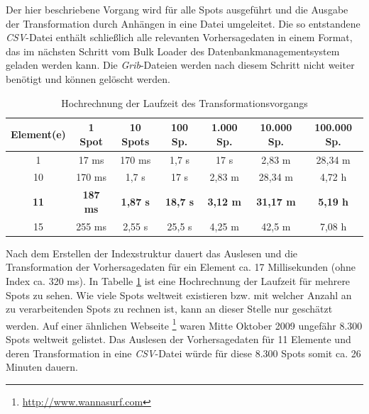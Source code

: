 

Der hier beschriebene Vorgang wird für alle Spots ausgeführt und die
Ausgabe der Transformation durch Anhängen in eine Datei
umgeleitet. Die so entstandene \textit{CSV}-Datei enthält schließlich
alle relevanten Vorhersagedaten in einem Format, das im nächsten
Schritt vom Bulk Loader des Datenbankmanagementsystem geladen werden
kann. Die \textit{Grib}-Dateien werden nach diesem Schritt nicht
weiter benötigt und können gelöscht werden.
\begin{table}[h]
  \centering
  {\sf
    \footnotesize
    \begin{longtable}{c|c|c|c|c|c|c}

      \toprule
      \textbf{Element(e)} & \textbf{1 Spot} & \textbf{10 Spots} & \textbf{100 Sp.} & \textbf{1.000 Sp.} & \textbf{10.000 Sp.} & \textbf{100.000 Sp.} \\
      \midrule
      1 & 17 ms & 170 ms & 1,7 s & 17 s & 2,83 m & 28,34 m \\
      10 & 170 ms & 1,7 s & 17 s & 2,83 m & 28,34 m & 4,72 h \\
      \textbf{11} & \textbf{187 ms} &  \textbf{1,87 s} & \textbf{18,7 s} & \textbf{3,12 m} & \textbf{31,17 m} & \textbf{5,19 h} \\
      15 & 255 ms & 2,55 s & 25,5 s & 4,25 m & 42,5 m &  7,08 h\\
      \bottomrule
    \end{longtable}
  }

  \caption{Hochrechnung der Laufzeit des Transformationsvorgangs}
  \label{tab:transformation_laufzeit}

\end{table}

Nach dem Erstellen der Indexstruktur dauert das Auslesen und die
Transformation der Vorhersagedaten für ein Element ca. 17
Millisekunden (ohne Index ca. 320 ms). In Tabelle
\ref{tab:transformation_laufzeit} ist eine Hochrechnung der Laufzeit
für mehrere Spots zu sehen. Wie viele Spots weltweit existieren
bzw. mit welcher Anzahl an zu verarbeitenden Spots zu rechnen ist,
kann an dieser Stelle nur geschätzt werden. Auf einer ähnlichen
Webseite \footnote{\url{http://www.wannasurf.com}} waren Mitte Oktober
2009 ungefähr 8.300 Spots weltweit gelistet. Das Auslesen der
Vorhersagedaten für 11 Elemente und deren Transformation in eine
\textit{CSV}-Datei würde für diese 8.300 Spots somit ca. 26 Minuten
dauern.

